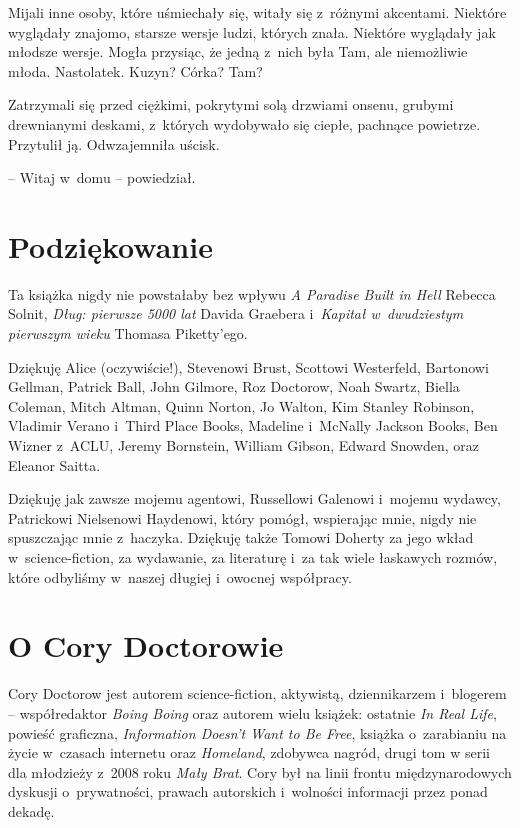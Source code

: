 \documentclass[oneside,polish,11pt,sfheadings]{mwbk}
\begin{document}
Mijali inne osoby, które uśmiechały się, witały się z~różnymi akcentami.
Niektóre wyglądały znajomo, starsze wersje ludzi, których znała.
Niektóre wyglądały jak młodsze wersje. Mogła przysiąc, że jedną z~nich
była Tam, ale niemożliwie młoda. Nastolatek. Kuzyn? Córka? Tam?

Zatrzymali się przed ciężkimi, pokrytymi solą drzwiami onsenu, grubymi
drewnianymi deskami, z~których wydobywało się ciepłe, pachnące
powietrze. Przytulił ją. Odwzajemniła uścisk.

-- Witaj w~domu -- powiedział.


\chapter*{Podziękowanie}

Ta książka nigdy nie powstałaby bez wpływu \textit{A Paradise Built in
Hell} Rebecca Solnit, \textit{Dług: pierwsze 5000 lat} Davida Graebera i~\textit{Kapitał w~dwudziestym pierwszym wieku} Thomasa Piketty'ego.

Dziękuję Alice (oczywiście!), Stevenowi Brust, Scottowi Westerfeld,
Bartonowi Gellman, Patrick Ball, John Gilmore, Roz Doctorow, Noah
Swartz, Biella Coleman, Mitch Altman, Quinn Norton, Jo Walton, Kim
Stanley Robinson, Vladimir Verano i~Third Place Books, Madeline i~McNally Jackson Books, Ben Wizner z~ACLU, Jeremy Bornstein, William
Gibson, Edward Snowden, oraz Eleanor Saitta.

Dziękuję jak zawsze mojemu agentowi, Russellowi Galenowi i~mojemu
wydawcy, Patrickowi Nielsenowi Haydenowi, który pomógł,
wspierając mnie, nigdy nie spuszczając mnie z~haczyka. Dziękuję także
Tomowi Doherty za jego wkład w~science-fiction, za wydawanie, za
literaturę i~za tak wiele łaskawych rozmów, które odbyliśmy w~naszej
długiej i~owocnej współpracy.

\chapter*{O Cory Doctorowie}

Cory Doctorow jest autorem science-fiction, aktywistą, dziennikarzem i~blogerem -- współredaktor \textit{Boing Boing} oraz autorem wielu książek:
ostatnie \textit{In Real Life}, powieść graficzna, \textit{Information
Doesn't Want to Be Free}, książka o~zarabianiu na życie w~czasach
internetu oraz \textit{Homeland}, zdobywca nagród, drugi tom w serii
dla młodzieży z~2008 roku \textit{Mały Brat}. Cory był na linii frontu
międzynarodowych dyskusji o~prywatności, prawach autorskich i~wolności
informacji przez ponad dekadę.
\end{document}
